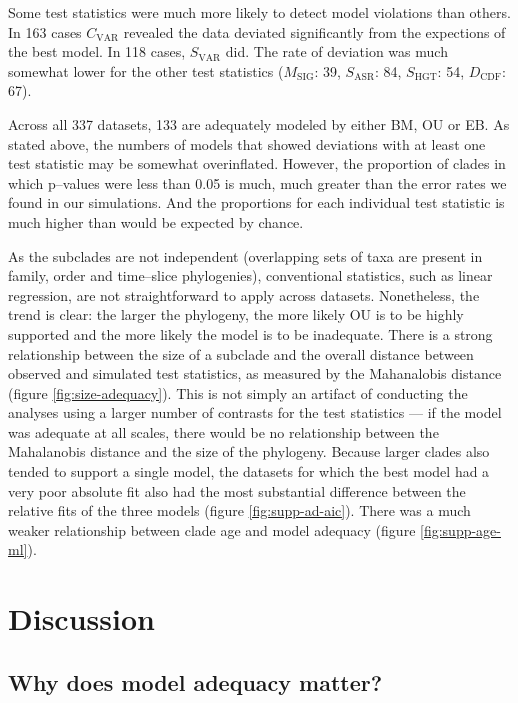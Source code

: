 \documentclass[a4paper,11pt]{article}
\begin{document}
{Some test statistics were much more likely to detect model violations than others. In 163 cases $C_{\text{VAR}}$ revealed the data deviated significantly from the expections of the best model. In 118 cases, $S_{\text{VAR}}$ did. The rate of deviation was much somewhat lower for the other test statistics ($M_{\text{SIG}}$: 39, $S_{\text{ASR}}$: 84, $S_{\text{HGT}}$: 54, $D_{\text{CDF}}$: 67).

Across all 337 datasets, 133 are adequately modeled by either BM, OU or EB. As stated above, the numbers of models that showed deviations with at least one test statistic may be somewhat overinflated. However, the proportion of clades in which p--values were less than 0.05 is much, much greater than the error rates we found in our simulations. And the proportions for each individual test statistic is much higher than would be expected by chance. 

As the subclades are not independent (overlapping sets of taxa are present in family, order and time--slice phylogenies), conventional statistics, such as linear regression, are not straightforward to apply across datasets. Nonetheless, the trend is clear: the larger the phylogeny, the more likely OU is to be highly supported and the more likely the model is to be inadequate. There is a strong relationship between the size of a subclade and the overall distance between observed and simulated test statistics, as measured by the Mahanalobis distance (figure \ref{fig:size-adequacy}). This is not simply an artifact of conducting the analyses using a larger number of contrasts for the test statistics --- if the model was adequate at all scales, there would be no relationship between the Mahalanobis distance and the size of the phylogeny. Because larger clades also tended to support a single model, the datasets for which the best model had a very poor absolute fit also had the most substantial difference between the relative fits of the three models (figure \ref{fig:supp-ad-aic}). There was a much weaker relationship between clade age and model adequacy (figure \ref{fig:supp-age-ml}).

\section{Discussion}

\subsection{Why does model adequacy matter?}

}
\end{document}
